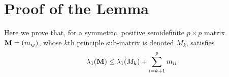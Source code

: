 \documentclass{article}
\begin{document}

\section{Proof of the Lemma}
Here we prove that, for a symmetric, positive semidefinite $p \times
p$ matrix $\mathbf{M} = (m_{ij})$, whose $k$th principle sub-matrix is denoted
$M_k$, satisfies
\[
\lambda_1(\mathbf{M}) \leq \lambda_1(M_{k}) + \sum_{i=k+1}^p m_{ii}
\]
\end{document}
